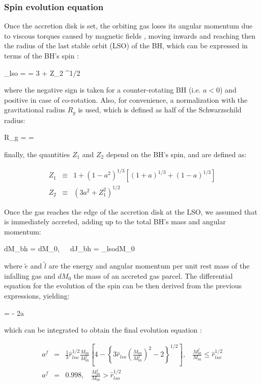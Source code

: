 \documentclass[a4,useAMS,usenatbib,usegraphicx,12pt]{article}
\begin{document}
\subsubsection{Spin evolution equation}

Once the accretion disk is set, the orbiting gas loses its angular momentum due to viscous torques
caused by magnetic fields \citep{Lynden-Bell1969}, moving inwards and reaching then the radius of the 
last stable orbit (LSO) of the BH, which can be expressed in terms of the BH's spin \citep{Bardeen1972}:

{ _{lso} =  = 3 + Z_2 \pm [ (3-Z_1)(3+Z_1+2Z_2) ]^{1/2} }

where the negative sign is taken for a counter-rotating BH (i.e. $a<0$) and positive in case of 
co-rotation. Also, for convenience, a normalization with the gravitational radius $R_g$ is used, which 
is defined as half of the Schwarzschild radius:

{ R_g =  =  }

finally, the quantities $Z_1$ and $Z_2$ depend on the BH's spin, and are defined as:

\begin{eqnarray}
Z_1 &\equiv& 1 + (1-a^2)^{1/3}\left[ (1+a)^{1/3} + (1-a)^{1/3} \right] \\
Z_2 &\equiv& ( 3a^2 + Z_1^2 )^{1/2}
\end{eqnarray}

Once the gas reaches the edge of the accretion disk at the LSO, we assumed that is immediately accreted,
adding up to the total BH's mass and angular momentum:

{ dM_{bh} = dM_0,\ \ \ dJ_{bh} = _{lso}dM_0 }

where $\tilde{e}$ and $\tilde{l}$ are the energy and angular momentum per unit rest mass of the infalling
gas and $dM_0$ the mass of an accreted gas parcel. The differential equation for the evolution of the spin 
can be then derived from the previous expressions, yielding:

{  =  - 2a }

which can be integrated to obtain the final evolution equation \citep{Bardeen1970}:

\begin{eqnarray}
a^f  & = & \frac{1}{3}\hat{r}_{lso}^{1/2}\frac{M_{bh}}{M^f_{bh}}\left[ 4 - \left\{ 3\hat{r}_{lso}\left(\frac{M_{bh}}{M^f_{bh}}\right)^2 - 2 \right\}^{1/2} \right],
    \ \ \ \ \frac{M^f_{bh}}{M_{bh}} \leq \hat{r}_{lso}^{1/2} \\
a^f  & = & 0.998, \ \ \ \ \frac{M^f_{bh}}{M_{bh}} > \hat{r}_{lso}^{1/2}
\end{eqnarray}
\end{document}
